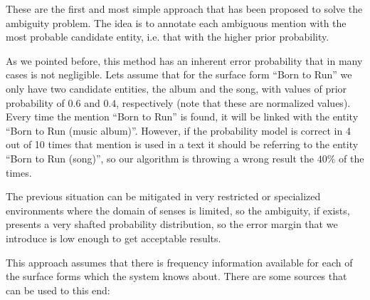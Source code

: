 These are the first and most simple approach that has been proposed to solve the ambiguity problem. The idea is to annotate each ambiguous mention with the most probable candidate entity, i.e. that with the higher prior probability.

As we pointed before, this method has an inherent error probability that in many cases is not negligible. Lets assume that for the surface form ``Born to Run'' we only have two candidate entities, the album and the song, with values of prior probability of $0.6$ and $0.4$, respectively (note that these are normalized values). Every time the mention ``Born to Run'' is found, it will be linked with the entity ``Born to Run (music album)''. However, if the probability model is correct in 4 out of 10 times that mention is used in a text it should be referring to the entity ``Born to Run (song)'', so our algorithm is throwing a wrong result the $40\%$ of the times.

The previous situation can be mitigated in very restricted or specialized environments where the domain of senses is limited, so the ambiguity, if exists, presents a very shafted probability distribution, so the error margin that we introduce is low enough to get acceptable results.

This approach assumes that there is frequency information available for each of the surface forms which the system knows about. There are some sources that can be used to this end:

